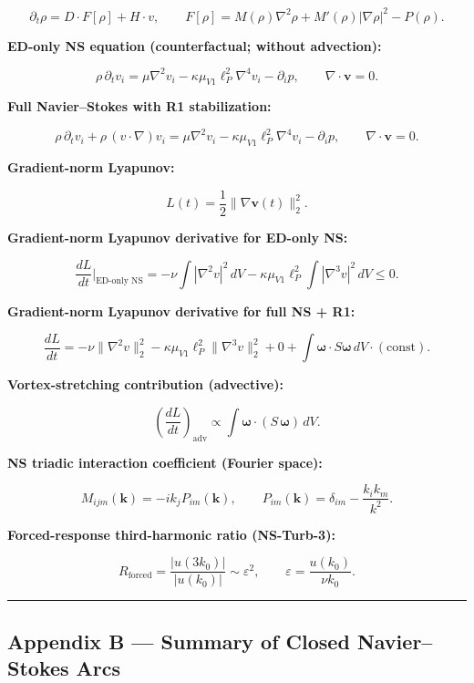 \documentclass[
  11pt,a4paper]{article}
\begin{document}
\[\partial_t \rho = D \cdot F[\rho] + H \cdot v, \qquad F[\rho] = M(\rho)\nabla^2\rho + M'(\rho)|\nabla\rho|^2 - P(\rho).\]

\textbf{ED-only NS equation (counterfactual; without advection):}

\[\rho \, \partial_t v_i = \mu \nabla^2 v_i - \kappa \mu_{V1} \ell_P^2 \nabla^4 v_i - \partial_i p, \qquad \nabla \cdot \mathbf{v} = 0.\]

\textbf{Full Navier--Stokes with R1 stabilization:}

\[\rho \, \partial_t v_i + \rho \, (v \cdot \nabla) v_i = \mu \nabla^2 v_i - \kappa \mu_{V1} \ell_P^2 \nabla^4 v_i - \partial_i p, \qquad \nabla \cdot \mathbf{v} = 0.\]

\textbf{Gradient-norm Lyapunov:}

\[L(t) = \frac{1}{2} \|\nabla \mathbf{v}(t)\|_2^2.\]

\textbf{Gradient-norm Lyapunov derivative for ED-only NS:}

\[\frac{dL}{dt}\bigg|_\text{ED-only NS} = -\nu \int |\nabla^2 v|^2 \, dV - \kappa \mu_{V1} \ell_P^2 \int |\nabla^3 v|^2 \, dV \le 0.\]

\textbf{Gradient-norm Lyapunov derivative for full NS + R1:}

\[\frac{dL}{dt} = -\nu\|\nabla^2 v\|_2^2 - \kappa\mu_{V1}\ell_P^2 \|\nabla^3 v\|_2^2 + 0 + \int \boldsymbol{\omega} \cdot S\boldsymbol{\omega} \, dV \cdot (\mathrm{const}).\]

\textbf{Vortex-stretching contribution (advective):}

\[\left(\frac{dL}{dt}\right)_\mathrm{adv} \propto \int \boldsymbol{\omega} \cdot (S\,\boldsymbol{\omega}) \, dV.\]

\textbf{NS triadic interaction coefficient (Fourier space):}

\[M_{ijm}(\mathbf{k}) = -i k_j P_{im}(\mathbf{k}), \qquad P_{im}(\mathbf{k}) = \delta_{im} - \frac{k_i k_m}{k^2}.\]

\textbf{Forced-response third-harmonic ratio (NS-Turb-3):}

\[R_\mathrm{forced} = \frac{|u(3k_0)|}{|u(k_0)|} \sim \varepsilon^2, \qquad \varepsilon = \frac{u(k_0)}{\nu k_0}.\]

\begin{center}\rule{0.5\linewidth}{0.5pt}\end{center}

\subsection{Appendix B --- Summary of Closed Navier--Stokes
Arcs}\label{appendix-b-summary-of-closed-navierstokes-arcs}
\end{document}
